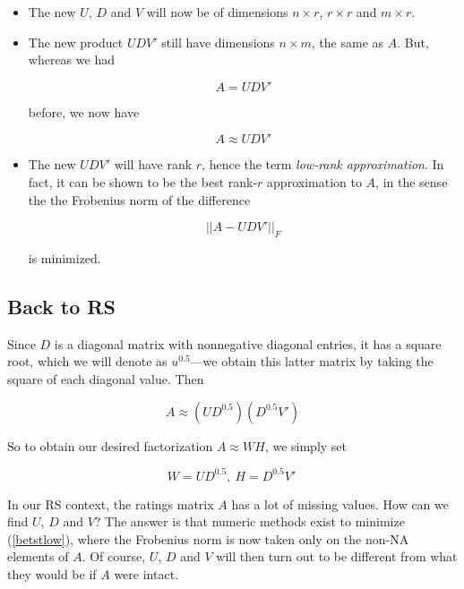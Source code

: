 \begin{itemize}

\item The new $U$, $D$ and $V$ will now be of dimensions
$n \times r$, $r \times r$ and $m \times r$.

\item The new product $UDV'$ still have dimensions $n \times m$,
the same as $A$.  But, whereas we had

\begin{equation}
A = UDV'
\end{equation}

before, we now have

\begin{equation}
A \approx UDV'
\end{equation}

\item The new $UDV'$ will have rank $r$, hence the term
\textit{low-rank approximation}.  In fact, it can be shown to be the
best rank-$r$ approximation to $A$, in the sense the the Frobenius norm
of the difference 

\begin{equation}
\label{bestlow}
|| A - UDV'||_{F}
\end{equation}

is minimized.

\end{itemize} 

\subsection{Back to RS}

Since $D$ is a diagonal matrix with nonnegative diagonal entries, it has
a square root, which we will denote as $u^{0.5}$---we obtain this latter
matrix by taking the square of each diagonal value.  Then

\begin{equation}
A \approx (UD^{0.5}) (D^{0.5} V')
\end{equation}

So to obtain our desired factorization $A \approx WH$, we simply set

\begin{equation}
W = UD^{0.5}, ~ H = D^{0.5}V' ~ 
\end{equation}

In our RS context, the ratings matrix $A$ has a lot of missing values.
How can we find $U$, $D$ and $V$?  The answer is that numeric methods
exist to minimize (\ref{betstlow}), where the Frobenius norm is now
taken only on the non-NA elements of $A$.  Of course, $U$, $D$ and $V$
will then turn out to be different from what they would be if $A$ were
intact.

